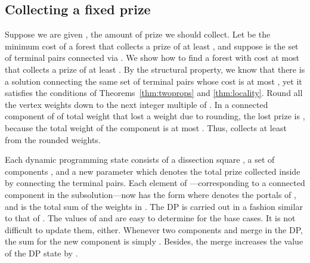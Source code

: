 \documentclass[extras,11pt]{article} \usepackage{fullpage}
\theoremstyle{mytheorem}
\begin{document}
\subsection{Collecting a fixed prize}
\label{sec:smpcsf}

Suppose we are given , the amount of prize we should collect.
Let  be the minimum cost of a forest  that collects a prize of at least ,
and suppose  is the set of terminal pairs connected via .
We show how to find a forest with cost at most   that collects
a prize of at least .
By the structural property, we know that there is a solution  connecting the same
 set of terminal pairs  whose cost is at most , yet it satisfies the
 conditions of Theorems~\ref{thm:twoprops} and \ref{thm:locality}.
Round all the vertex weights down to the next integer multiple of
.
In a connected component of  of total weight  that  lost a weight  due to
rounding, the lost prize is ,
because the total weight of the component is at most .
Thus,  collects at least  from the rounded weights.





Each dynamic programming state consists of a dissection square ,
a set of components , and a new parameter 
which denotes the total prize collected inside  by connecting
the terminal pairs.
Each element of ---corresponding to a connected component in the subsolution---now has the form 
where  denotes the portals of , 
and  is the total sum of the weights in .
The DP is carried out in a fashion similar to that of \cite{arora98:ptas}.
The values of  and  are easy to determine for the base cases.
It is not difficult to update them, either.
Whenever two components  and 
merge in the DP, the sum  for the new component is simply .
Besides, the merge increases the  value of the DP state by .



\iffalse
Each dynamic programming state consists of a dissection square , a configuration
, and a new parameter  which denotes the total
 prize collected inside  by connecting the terminal pairs.
In addition, each element of  now has the form ,
where  is the total sum of the weights in .
The values of  and  are easy to determine for the base cases.
It is not difficult to update them either.
Whenever two components  and 
merge in the DP, the sum  for the new component is simply .
Besides, the merge increases the  value of the DP state by .
\fi
\end{document}
